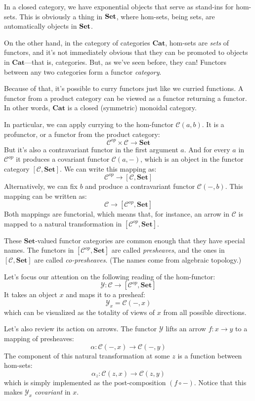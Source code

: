 \documentclass[DaoFP]{subfiles}
\begin{document}
In a closed category, we have exponential objects that serve as stand-ins for hom-sets. This is obviously a thing in $\mathbf{Set}$, where hom-sets, being sets, are automatically objects in $\mathbf{Set}$. 

On the other hand, in the category of categories  $\mathbf{Cat}$, hom-sets are \emph{sets} of functors, and it's not immediately obvious that they can be promoted to objects in $\mathbf{Cat}$---that is, categories. But, as we've seen before, they can! Functors between any two categories form a functor \emph{category}.

Because of that, it's possible to curry functors just like we curried functions. A functor from a product category can be viewed as a functor returning a functor. In other words, $\mathbf{Cat}$ is a closed (symmetric) monoidal category.

In particular, we can apply currying to the hom-functor $\mathcal{C}(a, b)$. It is a profunctor, or a functor from the product category:
\[ \mathcal{C}^{op} \times \mathcal{C} \to  \mathbf{Set} \]
But it's also a contravariant functor in the first argument $a$. And for every $a$ in  $\mathcal{C}^{op}$  it produces a covariant functor $\mathcal{C}(a, -)$, which is an object in the functor category $ [\mathcal{C},  \mathbf{Set}] $. We can write this mapping as:
\[ \mathcal{C}^{op} \to [\mathcal{C},  \mathbf{Set}] \]
Alternatively, we can fix $b$ and produce a contravariant functor $\mathcal{C}(-, b)$. This mapping can be written as:
\[ \mathcal{C} \to [\mathcal{C}^{op},  \mathbf{Set}] \]
Both mappings are functorial, which means that, for instance, an arrow in $\mathcal{C}$ is mapped to a natural transformation in $[\mathcal{C}^{op},  \mathbf{Set}]$.

These $\mathbf{Set}$-valued functor categories are common enough that they have special names. The functors in $[\mathcal{C}^{op},  \mathbf{Set}]$ are called \emph{presheaves}, and the ones in $[\mathcal{C},  \mathbf{Set}]$ are called \emph{co-presheaves}. (The names come from algebraic topology.)

Let's focus our attention on the following reading of the hom-functor:
\[ \mathcal{Y} \colon \mathcal{C} \to [\mathcal{C}^{op},  \mathbf{Set}] \]
It takes an object $x$ and maps it to a presheaf:
\[ \mathcal Y_x = \mathcal{C}(-, x) \]
which can be visualized as the totality of views of $x$ from all possible directions.

Let's also review its action on arrows. The functor $\mathcal{Y}$ lifts an arrow $f \colon x \to y$ to a mapping of presheaves:
\[ \alpha \colon \mathcal{C}(-, x) \to \mathcal{C}(-, y) \]
The component of this natural transformation at some $z$ is a function between hom-sets:
\[ \alpha_z \colon \mathcal{C}(z, x) \to \mathcal{C}(z, y) \]
which is simply implemented as the post-composition $(f \circ -)$. Notice that this makes $ \mathcal Y_x$ \emph{covariant} in $x$.
\end{document}
